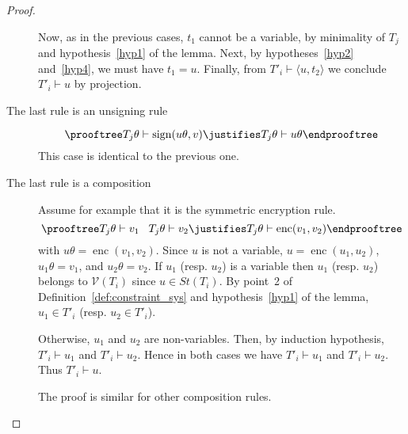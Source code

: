 \documentclass[acmtocl,acmnow]{acmtrans2m}
\newcommand{\var}{\mathcal{V}}
\newcommand{\pair}[2]{\langle{#1},{#2}\rangle}
\newcommand{\st}{\mathit{St}}
\newcommand{\penc}[2]{\operatorname{enc}(#1,#2)}
\newcommand{\sign}{\operatorname{sign}}
\begin{document}
\begin{proof}
\begin{description}
Now, as in the previous cases, $t_1$ cannot be a variable, by minimality of
$T_j$ and hypothesis~\ref{hyp1} of the lemma. Next, by hypotheses~\ref{hyp2}
and~\ref{hyp4}, we must have $t_1=u$. Finally, from $T'_i \vdash \pair{u}{t_2}$
we conclude $T'_i \vdash u$ by projection.


\item[The last rule is an unsigning rule]
\[ \prooftree
T_j\theta\vdash \sign(u\theta,v)
\justifies T_j\theta \vdash u\theta
\endprooftree
\]
This case is identical to the previous one.


\item[The last rule is a composition]
Assume for example that it is the symmetric encryption rule. 
\[
\prooftree
T_j\theta \vdash v_1\;\;
\;T_j\theta \vdash v_2
\justifies T_j\theta \vdash \penc{v_1}{v_2}
\endprooftree
\]
with
$u\theta = \penc{v_1}{v_2}$.
 Since $u$ is not a variable,
$u=\penc{u_1}{u_2}$, $u_1\theta=v_1$, and $u_2\theta=v_2$. If $u_1$
(resp. $u_2$) is a variable then $u_1$ (resp. $u_2$) belongs to
$\var(T_i)$ since $u\in \st(T_i)$. By 
point~2 of Definition~\ref{def:constraint_sys} and hypothesis~\ref{hyp1}
of the lemma, $u_1\in T'_i$ (resp. $u_2\in T'_i$). 

Otherwise, $u_1$ and $u_2$ are
non-variables. Then, by induction hypothesis, $T'_i \vdash u_1$ and $T'_i \vdash u_2$. Hence in both cases
we have $T'_i\vdash u_1$ and $T'_i\vdash u_2$. Thus $T'_i\vdash u$.

The proof is similar for other composition rules. 
\end{description}
\end{proof}
\end{document}
